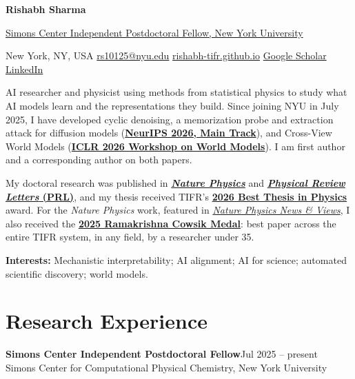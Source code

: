 \documentclass[11pt,letterpaper]{article}
\newcommand{\sep}{\unskip\enspace{\color{muted}\textbar}\enspace\ignorespaces}
\newcommand{\role}[3]{\textbf{#1}\hfill #2\\#3\par}
\begin{document}
{\fontsize{25}{28}\selectfont\bfseries Rishabh Sharma}\par
\vspace{3pt}
{\large \href{https://wp.nyu.edu/sccpc/people/}{Simons Center Independent Postdoctoral Fellow, New York University}}\par
\vspace{4pt}
{\small New York, NY, USA\sep
\href{mailto:rs10125@nyu.edu}{rs10125@nyu.edu}\sep
\href{https://rishabh-tifr.github.io}{rishabh-tifr.github.io}\sep
\href{https://scholar.google.com/citations?user=tXkkMfYAAAAJ&hl=en}{Google Scholar}\sep
\href{https://www.linkedin.com/in/rishabh-nyu/}{LinkedIn}}\par
\vspace{9pt}
AI researcher and physicist using methods from statistical physics to study what AI models learn
and the representations they build. Since joining NYU in July 2025, I have developed cyclic denoising,
a memorization probe and extraction attack for diffusion models
(\href{https://arxiv.org/abs/2606.24000}{\textbf{NeurIPS 2026, Main Track}}), and Cross-View World Models
(\href{https://openreview.net/forum?id=0g7De0sXWM}{\textbf{ICLR 2026 Workshop on World Models}}).
I am first author and a corresponding author on both papers.\par\vspace{4pt}
My doctoral research was published in
\href{https://doi.org/10.1038/s41567-024-02724-5}{\textbf{\textit{Nature Physics}}} and
\href{https://doi.org/10.1103/PhysRevLett.134.018202}{\textbf{\textit{Physical Review Letters} (PRL)}},
and my thesis received TIFR's \href{https://www.tifr.res.in/~academics/best_thesis.php}{\textbf{2026 Best Thesis in Physics}} award.
For the \textit{Nature Physics} work, featured in
\href{https://www.nature.com/articles/s41567-025-02900-1}{\textit{Nature Physics News \& Views}}, I also received the
\href{https://www.tifr.res.in/~endowment/endowment-awards.htm}{\textbf{2025 Ramakrishna Cowsik Medal}}:
best paper across the entire TIFR system, in any field, by a researcher under 35.\par\vspace{5pt}
{\small\raggedright\textbf{Interests:} Mechanistic interpretability; AI alignment; AI for science; automated scientific discovery; world models.\par}

\section{Research Experience}
\role{Simons Center Independent Postdoctoral Fellow}{Jul 2025 -- present}
{Simons Center for Computational Physical Chemistry, New York University}
\end{document}

